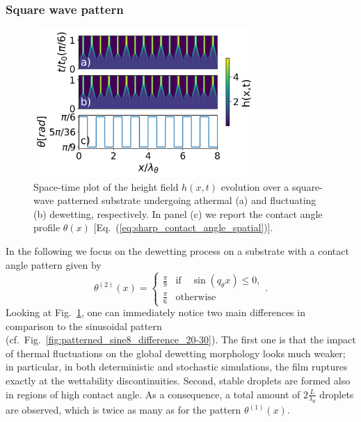 \subsubsection{Square wave pattern}\label{subsubsec:square_wave}
\begin{figure}
    \centering
    \includegraphics[width=0.75\textwidth]{graphics/spacedepCA_['delta', '1e7', '10', 25, '9_3', 2000000.0]_v2.png}
    \caption{Space-time plot of the height field $h(x,t)$ evolution over a square-wave patterned substrate undergoing athermal (a) and fluctuating (b) dewetting, respectively. 
    In panel (c) we report the contact angle profile $\theta(x)$ [Eq.~(\ref{eq:sharp_contact_angle_spatial})].} 
    \label{fig:patterned_step8_difference_20-30}
\end{figure}
In the following we focus on the dewetting process on a substrate with a contact angle pattern given by 
\begin{equation}\label{eq:sharp_contact_angle_spatial}
    {\theta^{(2)}(x)} = 
    \left\{
    \begin{array}{ll}
        \frac{\pi}{9} & \text{if} \quad\sin(q_{\theta}x) \leq 0, \\
        \frac{\pi}{6} & \text{otherwise}
    \end{array}
    \right..
\end{equation}
Looking at Fig.~\ref{fig:patterned_step8_difference_20-30}, one can immediately notice two main differences in comparison to the sinusoidal pattern (cf.~Fig.~\ref{fig:patterned_sine8_difference_20-30}). 
The first one is that the impact of thermal fluctuations on the global dewetting morphology looks much weaker; in particular, in both deterministic and stochastic simulations, the film ruptures exactly at the wettability discontinuities.
Second, stable droplets are formed also in regions of high contact angle. 
As a consequence, a total amount of $2\frac{L}{\lambda_{\theta}}$ droplets are observed, which is twice as many as for the pattern $\theta^{(1)}(x)$.

